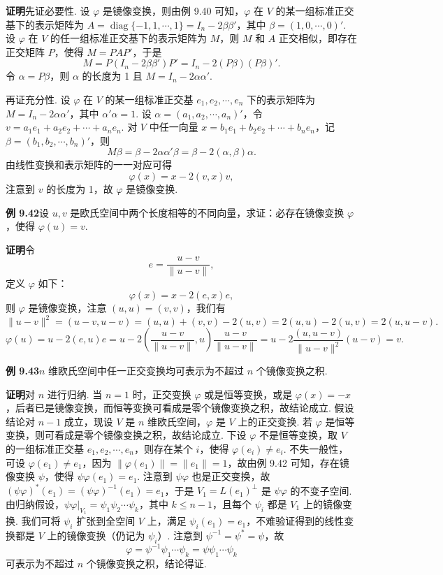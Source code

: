 \documentclass[UTF8,12pt,a4paper,fontset=fandol]{ctexart}
\begin{document}
\noindent\textbf{证明}\quad 先证必要性. 设 $\varphi$ 是镜像变换，则由例 9.40 可知，$\varphi$ 在 $V$ 的某一组标准正交基下的表示矩阵为 $A=\operatorname{diag}\{-1,1,\cdots,1\}=I_n-2\beta\beta'$，其中 $\beta=(1,0,\cdots,0)'$. 设 $\varphi$ 在 $V$ 的任一组标准正交基下的表示矩阵为 $M$，则 $M$ 和 $A$ 正交相似，即存在正交矩阵 $P$，使得 $M=PAP'$，于是
\[
M=P(I_n-2\beta\beta')P'=I_n-2(P\beta)(P\beta)'.
\]
令 $\alpha=P\beta$，则 $\alpha$ 的长度为 1 且 $M=I_n-2\alpha\alpha'$.

再证充分性. 设 $\varphi$ 在 $V$ 的某一组标准正交基 $e_1,e_2,\cdots,e_n$ 下的表示矩阵为
$M=I_n-2\alpha\alpha'$，其中 $\alpha'\alpha=1$. 设 $\alpha=(a_1,a_2,\cdots,a_n)'$，令 $v=a_1e_1+a_2e_2+\cdots+a_ne_n$. 对 $V$ 中任一向量 $x=b_1e_1+b_2e_2+\cdots+b_ne_n$，记 $\beta=(b_1,b_2,\cdots,b_n)'$，则
\[
M\beta=\beta-2\alpha\alpha'\beta=\beta-2(\alpha,\beta)\alpha.
\]
由线性变换和表示矩阵的一一对应可得
\[
\varphi(x)=x-2(v,x)v,
\]
注意到 $v$ 的长度为 1，故 $\varphi$ 是镜像变换.

\noindent\textbf{例 9.42}\quad 设 $u,v$ 是欧氏空间中两个长度相等的不同向量，求证：必存在镜像变换 $\varphi$，使得 $\varphi(u)=v$.

\noindent\textbf{证明}\quad 令
\[
e=\frac{u-v}{\|u-v\|},
\]
定义 $\varphi$ 如下：
\[
\varphi(x)=x-2(e,x)e,
\]
则 $\varphi$ 是镜像变换，注意 $(u,u)=(v,v)$，我们有
\[
\|u-v\|^2=(u-v,u-v)=(u,u)+(v,v)-2(u,v)=2(u,u)-2(u,v)=2(u,u-v).
\]
\[
\varphi(u)=u-2(e,u)e
=u-2\left(\frac{u-v}{\|u-v\|},u\right)\frac{u-v}{\|u-v\|}
=u-2\frac{(u,u-v)}{\|u-v\|^2}(u-v)=v.
\]

\noindent\textbf{例 9.43}\quad $n$ 维欧氏空间中任一正交变换均可表示为不超过 $n$ 个镜像变换之积.

\noindent\textbf{证明}\quad 对 $n$ 进行归纳. 当 $n=1$ 时，正交变换 $\varphi$ 或是恒等变换，或是 $\varphi(x)=-x$，后者已是镜像变换，而恒等变换可看成是零个镜像变换之积，故结论成立. 假设结论对 $n-1$ 成立，现设 $V$ 是 $n$ 维欧氏空间，$\varphi$ 是 $V$ 上的正交变换. 若 $\varphi$ 是恒等变换，则可看成是零个镜像变换之积，故结论成立. 下设 $\varphi$ 不是恒等变换，取 $V$ 的一组标准正交基 $e_1,e_2,\cdots,e_n$，则存在某个 $i$，使得 $\varphi(e_i)\ne e_i$. 不失一般性，可设 $\varphi(e_1)\ne e_1$，因为 $\|\varphi(e_1)\|=\|e_1\|=1$，故由例 9.42 可知，存在镜像变换 $\psi$，使得 $\psi\varphi(e_1)=e_1$. 注意到 $\psi\varphi$ 也是正交变换，故 $(\psi\varphi)^*(e_1)=(\psi\varphi)^{-1}(e_1)=e_1$，于是 $V_1=L(e_1)^\perp$ 是 $\psi\varphi$ 的不变子空间. 由归纳假设，$\psi\varphi|_{V_1}=\psi_1\psi_2\cdots\psi_k$，其中 $k\le n-1$，且每个 $\psi_i$ 都是 $V_1$ 上的镜像变换. 我们可将 $\psi_i$ 扩张到全空间 $V$ 上，满足 $\psi_i(e_1)=e_1$，不难验证得到的线性变换都是 $V$ 上的镜像变换（仍记为 $\psi_i$）. 注意到 $\psi^{-1}=\psi^*=\psi$，故
\[
\varphi=\psi^{-1}\psi_1\cdots\psi_k=\psi\psi_1\cdots\psi_k
\]
可表示为不超过 $n$ 个镜像变换之积，结论得证.
\end{document}
